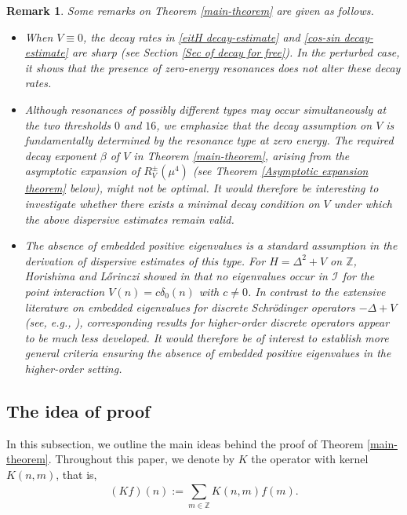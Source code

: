 \documentclass[reqno, 11pt]{amsart}
\newtheorem{remark}[definition]{Remark}
\newcommand\Z{\mathbb{Z}}
\newcommand\mcaI{\mathcal{I}}
\numberwithin{equation}{section}
\begin{document}
\begin{remark}\label{Rem of M}{\rm Some remarks on Theorem \ref{main-theorem} are given as follows.}
{\rm \begin{itemize}
\item[{\rm (i)}] When $V\equiv0$, the decay rates in \eqref{eitH decay-estimate} and \eqref{cos-sin decay-estimate} are sharp (see Section \ref{Sec of decay for free}). In the perturbed case, it shows that the presence of zero-energy resonances does not alter these decay rates.
\vskip0.1cm
\item[{\rm (ii)}] Although resonances of possibly different types may occur simultaneously at the two thresholds $0$ and $16$, we emphasize that the decay assumption on $V$ is fundamentally determined by the resonance type at zero energy. The required decay exponent $\beta$ of $V$ in Theorem \ref{main-theorem}, arising from the asymptotic expansion of $R^\pm_V(\mu^4)$ (see Theorem \ref{Asymptotic expansion theorem} below), might not be optimal. It would therefore be interesting to investigate whether there exists a minimal decay condition on $V$ under which the above dispersive estimates remain valid.
\vskip0.1cm
\item[{\rm (iii)}] The absence of embedded positive eigenvalues is a standard assumption in the derivation of dispersive estimates of this type. For $H=\Delta^2+V$ on $\Z$, Horishima and L\H{o}rinczi showed in \cite{HL14} that no eigenvalues occur in $\mcaI$ for the point interaction $V(n)=c\delta_0(n)$ with $c\neq0$. In contrast to the extensive literature on embedded eigenvalues for discrete Schr\"odinger operators $-\Delta+V$ (see, e.g., \cite{HMO11,HSSS12,Kru12,IM14,BS12,HHNO16,Man19,Liu19,HMK22,Liu22,LMT24}), corresponding results for higher-order discrete operators appear to be much less developed. It would therefore be of interest to establish more general criteria ensuring the absence of embedded positive eigenvalues in the higher-order setting.

\end{itemize}
}
\end{remark}

\subsection{The idea of proof}\label{subsec of idea of proof}
In this subsection, we outline the main ideas behind the proof of Theorem \ref{main-theorem}.
Throughout this paper, we denote by $K$ the operator with kernel $K(n,m)$, that is,
 $$(Kf)(n):=\sum\limits_{m\in\Z}^{}K(n,m)f(m).$$
\end{document}
